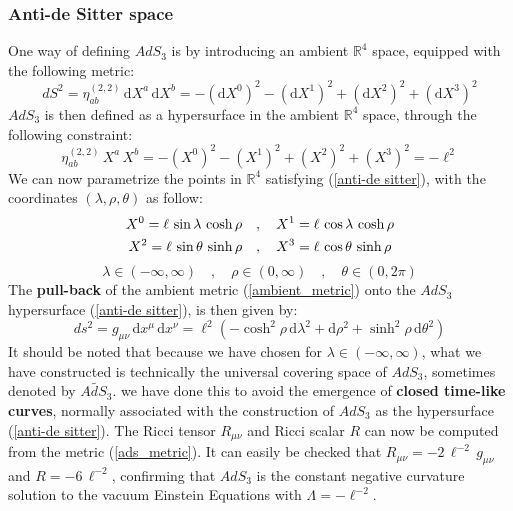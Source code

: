 \subsubsection{Anti-de Sitter space}
One way of defining $AdS_3$ is by introducing an ambient $\mathbb{R}^4$ space, equipped with the following metric:
%
% 
\begin{equation}\label{ambient_metric}
dS^2
= \eta_{ab}^{(2,2)} \, \mathrm{d}X^a \, \mathrm{d}X^b
= -(\mathrm{d}X^0)^2 - (\mathrm{d}X^1)^2 + (\mathrm{d}X^2)^2 + (\mathrm{d}X^3)^2
\end{equation}
%
%
$AdS_3$ is then defined as a hypersurface in the ambient $\mathbb{R}^4$ space, through the following constraint:
%
%
\begin{equation}\label{anti-de sitter}
\eta_{ab}^{(2,2)} \, X^a \, X^b
= -(X^0)^2 - (X^1)^2 + (X^2)^2 + (X^3)^2
= -\ell^2
\end{equation}
%
%
We can now parametrize the points in $\mathbb{R}^4$ satisfying (\ref{anti-de sitter}), with the coordinates $(\lambda, \rho, \theta)$ as follow:
%
%
\begin{align}
X^0 = \ell \, \sin\lambda \, \cosh\rho
\quad & , \quad
X^1 = \ell \, \cos\lambda \, \cosh\rho
%
\notag\\
%
X^2 = \ell \, \sin\theta \, \sinh\rho
\quad & , \quad
X^3 = \ell \, \cos\theta \, \sinh\rho \label{ads_parameterized}
\end{align}
%
\begin{equation*}
\lambda \in (-\infty, \infty)
\quad , \quad
\rho \in (0, \infty)
\quad , \quad
\theta \in (0, 2 \pi)
\end{equation*}
%
%
The \textbf{pull-back} of the ambient metric (\ref{ambient_metric}) onto the $AdS_3$ hypersurface (\ref{anti-de sitter}), is then given by:
%
%
\begin{equation}\label{ads_metric}
ds^2 = g_{\mu\nu} \, \mathrm{d}x^\mu \, \mathrm{d}x^\nu
= \ell^2 \left(
-\cosh^2\rho \, \mathrm{d}\lambda^2
+ \mathrm{d}\rho^2
+ \sinh^2\rho \, \mathrm{d}\theta^2
\right)
\end{equation}
%
%
It should be noted that because we have chosen for $\lambda \in (-\infty, \infty)$, what we have constructed is technically the universal covering space of $AdS_3$, sometimes denoted by $\widetilde{AdS_3}$. we have done this to avoid the emergence of \textbf{closed time-like curves}, normally associated with the construction of $AdS_3$ as the hypersurface (\ref{anti-de sitter}). The Ricci tensor $R_{\mu\nu}$ and Ricci scalar $R$ can now be computed from the metric (\ref{ads_metric}). It can easily be checked that $R_{\mu\nu} = -2 \, \ell^{-2} \, g_{\mu\nu}$ and $R = - 6 \, \ell^{-2}$, confirming that $AdS_3$ is the constant negative curvature solution to the vacuum Einstein Equations with $\Lambda = -\ell^{-2}$.\newline
